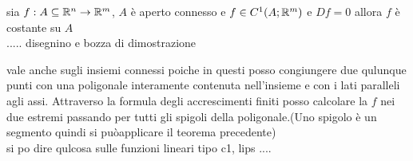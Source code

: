 \proposition
sia $f:A\subseteq \mathbb{R}^n \rightarrow \mathbb{R}^m$, $A$ è aperto connesso e $f\in C^1(A;\mathbb{R}^m)$ e $Df=0$ allora $f$ è costante su $A$\\
..... disegnino e bozza di dimostrazione

\observation vale anche sugli insiemi connessi poiche in questi posso congiungere due qulunque punti con una poligonale interamente contenuta nell'insieme e con i lati paralleli agli assi. Attraverso la formula degli accrescimenti finiti posso calcolare la $f$ nei due estremi passando per tutti gli spigoli della poligonale.(Uno spigolo è un segmento quindi si puòapplicare il teorema precedente)\\

si po dire qulcosa sulle funzioni lineari tipo c1, lips ....\\

